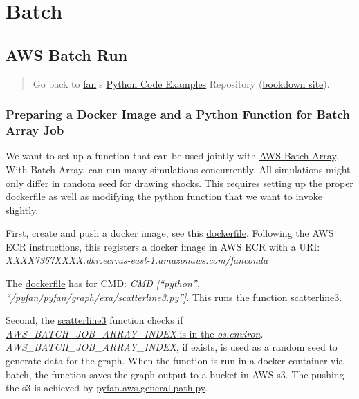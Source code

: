 \documentclass[
]{book}
\begin{document}
\hypertarget{batch}{%
\section{Batch}\label{batch}}

\hypertarget{aws-batch-run}{%
\subsection{AWS Batch Run}\label{aws-batch-run}}

\begin{quote}
Go back to \href{http://fanwangecon.github.io/}{fan}'s \href{https://fanwangecon.github.io/pyfan/}{Python Code Examples} Repository (\href{https://fanwangecon.github.io/pyfan/bookdown}{bookdown site}).
\end{quote}

\hypertarget{preparing-a-docker-image-and-a-python-function-for-batch-array-job}{%
\subsubsection{Preparing a Docker Image and a Python Function for Batch Array Job}\label{preparing-a-docker-image-and-a-python-function-for-batch-array-job}}

We want to set-up a function that can be used jointly with \href{https://docs.aws.amazon.com/batch/latest/userguide/array_jobs.html}{AWS Batch Array}. With Batch Array, can run many simulations concurrently. All simulations might only differ in random seed for drawing shocks. This requires setting up the proper dockerfile as well as modifying the python function that we want to invoke slightly.

First, create and push a docker image, see this \href{https://fanwangecon.github.io/pyfan/vig/docker/setup/htmlpdfr/fs_docker_ecr.html\#141_Example_Docker_File_for_AWS}{dockerfile}. Following the AWS ECR instructions, this registers a docker image in AWS ECR with a URI: \emph{XXXX7367XXXX.dkr.ecr.us-east-1.amazonaws.com/fanconda}

The \href{https://fanwangecon.github.io/pyfan/vig/docker/setup/htmlpdfr/fs_docker_ecr.html\#141_Example_Docker_File_for_AWS}{dockerfile} has for CMD: \emph{CMD {[}``python'', ``/pyfan/pyfan/graph/exa/scatterline3.py''{]}}. This runs the function \href{https://github.com/FanWangEcon/pyfan/blob/master/pyfan/graph/exa/scatterline3.py}{scatterline3}.

Second, the \href{https://github.com/FanWangEcon/pyfan/blob/master/pyfan/graph/exa/scatterline3.py}{scatterline3} function checks if \href{https://github.com/FanWangEcon/pyfan/blob/master/pyfan/graph/exa/scatterline3.py\#L167}{\emph{AWS\_BATCH\_JOB\_ARRAY\_INDEX} is in the \emph{os.environ}}. \emph{AWS\_BATCH\_JOB\_ARRAY\_INDEX}, if exists, is used as a random seed to generate data for the graph. When the function is run in a docker container via batch, the function saves the graph output to a bucket in AWS s3. The pushing the s3 is achieved by \href{https://github.com/FanWangEcon/pyfan/blob/master/pyfan/aws/general/path.py}{pyfan.aws.general.path.py}.
\end{document}

